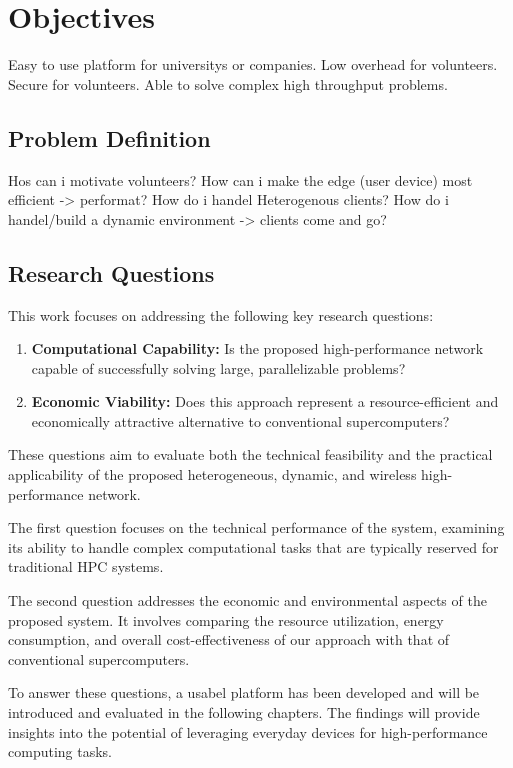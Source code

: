 \section{Objectives}
\label{sec:intro:objectives}
Easy to use platform for universitys or companies. Low overhead for volunteers. Secure for volunteers. Able to solve complex high throughput problems.

\subsection{Problem Definition}
\label{subsec:into:objectives:problems}
Hos can i motivate volunteers? How can i make the edge (user device) most efficient -> performat? How do i handel Heterogenous clients? How do i handel/build a dynamic environment -> clients come and go?

\subsection{Research Questions}
\label{subsec:into:objectives:questions}
This work focuses on addressing the following key research questions:

\begin{enumerate}
    \item \textbf{Computational Capability:} Is the proposed high-performance network capable of successfully solving large, parallelizable problems?
    
    \item \textbf{Economic Viability:} Does this approach represent a resource-efficient and economically attractive alternative to conventional supercomputers?
\end{enumerate}

These questions aim to evaluate both the technical feasibility and the practical applicability of the proposed heterogeneous, dynamic, and wireless high-performance network.

The first question focuses on the technical performance of the system, examining its ability to handle complex computational tasks that are typically reserved for traditional \ac{HPC} systems.

The second question addresses the economic and environmental aspects of the proposed system. It involves comparing the resource utilization, energy consumption, and overall cost-effectiveness of our approach with that of conventional supercomputers.

To answer these questions, a usabel platform has been developed and will be introduced and evaluated in the following chapters. The findings will provide insights into the potential of leveraging everyday devices for high-performance computing tasks.

